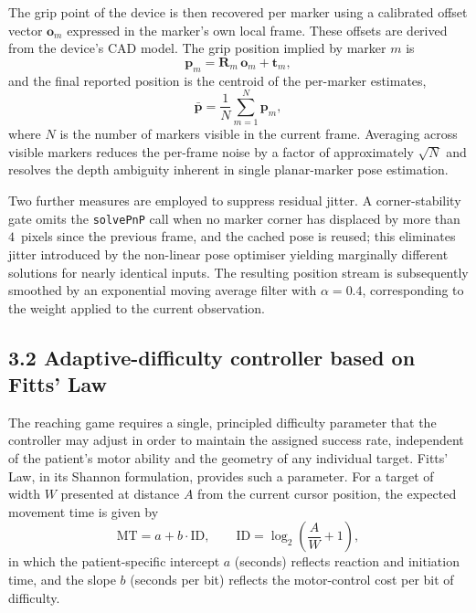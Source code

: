 \documentclass[11pt,a4paper]{article}
\begin{document}
The grip point of the device is then recovered per marker using a calibrated offset vector $\mathbf{o}_m$ expressed in the marker's own local frame. These offsets are derived from the device's CAD model. The grip position implied by marker $m$ is
\begin{equation}
    \mathbf{p}_m = \mathbf{R}_m\, \mathbf{o}_m + \mathbf{t}_m,
\end{equation}
and the final reported position is the centroid of the per-marker estimates,
\begin{equation}
    \bar{\mathbf{p}} = \frac{1}{N} \sum_{m=1}^{N} \mathbf{p}_m,
\end{equation}
where $N$ is the number of markers visible in the current frame. Averaging across visible markers reduces the per-frame noise by a factor of approximately $\sqrt{N}$ and resolves the depth ambiguity inherent in single planar-marker pose estimation.

Two further measures are employed to suppress residual jitter. A corner-stability gate omits the \texttt{solvePnP} call when no marker corner has displaced by more than $4$~pixels since the previous frame, and the cached pose is reused; this eliminates jitter introduced by the non-linear pose optimiser yielding marginally different solutions for nearly identical inputs. The resulting position stream is subsequently smoothed by an exponential moving average filter with $\alpha = 0.4$, corresponding to the weight applied to the current observation.

\subsection*{3.2 Adaptive-difficulty controller based on Fitts' Law}

The reaching game requires a single, principled difficulty parameter that the controller may adjust in order to maintain the assigned success rate, independent of the patient's motor ability and the geometry of any individual target. Fitts' Law, in its Shannon formulation, provides such a parameter. For a target of width $W$ presented at distance $A$ from the current cursor position, the expected movement time is given by
\begin{equation}
    \text{MT} = a + b \cdot \text{ID}, \qquad \text{ID} = \log_2\!\left(\frac{A}{W} + 1\right),
\end{equation}
in which the patient-specific intercept $a$ (seconds) reflects reaction and initiation time, and the slope $b$ (seconds per bit) reflects the motor-control cost per bit of difficulty.
\end{document}
